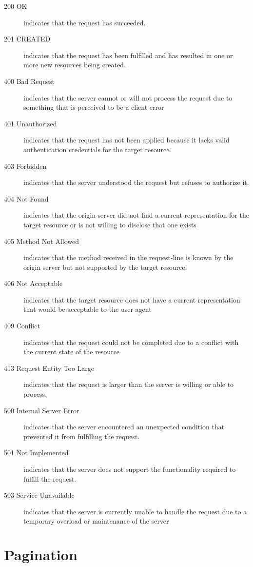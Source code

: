 \documentclass[10pt,a4paper]{article}
\begin{document}
\begin{description}
\item[200 OK] indicates that the request has succeeded.
\item[201 CREATED] indicates that the request has been fulfilled and has resulted in one or more new resources being created.
\item[400 Bad Request] indicates that the server cannot or will not process the request due to something that is perceived to be a client error
\item[401 Unauthorized] indicates that the request has not been applied because it lacks valid authentication credentials for the target resource.
\item[403 Forbidden] indicates that the server understood the request but refuses to authorize it.
\item[404 Not Found] indicates that the origin server did not find a current representation for the target resource or is not willing to disclose that one exists
\item[405 Method Not Allowed] indicates that the method received in the request-line is known by the origin server but not supported by the target resource.
\item[406 Not Acceptable] indicates that the target resource does not have a current representation that would be acceptable to the user agent
\item[409 Conflict] indicates that the request could not be completed due to a conflict with the current state of the resource
\item[413 Request Entity Too Large] indicates that the request is larger than the server is willing or able to process.
\item[500 Internal Server Error] indicates that the server encountered an unexpected condition that prevented it from fulfilling the request.
\item[501 Not Implemented] indicates that the server does not support the functionality required to fulfill the request.
\item[503 Service Unavailable] indicates that the server is currently unable to handle the request due to a temporary overload or maintenance of the server
\end{description}

\section{Pagination}
\label{sec:pagin}
\end{document}
